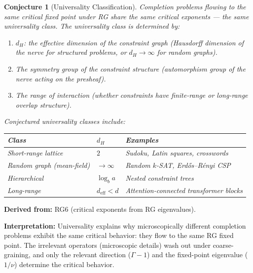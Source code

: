 \documentclass[11pt,letterpaper]{article}
\newtheorem{conjecture}{Conjecture}[section]
\begin{document}
\begin{conjecture}[Universality 
Classification]\label{conj:universality}
Completion problems flowing to the same critical fixed point under 
RG share the same critical exponents --- the same 
\emph{universality class}. The universality class is determined by:
\begin{enumerate}[label=(\roman*)]
    \item $d_H$: the effective dimension of the constraint graph 
    (Hausdorff dimension of the nerve for structured problems, or 
    $d_H \to \infty$ for random graphs).
    
    \item The \emph{symmetry group} of the constraint structure 
    (automorphism group of the nerve acting on the presheaf).
    
    \item The \emph{range of interaction} (whether constraints have 
    finite-range or long-range overlap structure).
\end{enumerate}

Conjectured universality classes include:

\begin{center}
\renewcommand{\arraystretch}{1.3}
\begin{tabular}{llp{3.8cm}}
\textbf{Class} & $d_H$ & \textbf{Examples} \\
\hline
Short-range lattice & $2$ & Sudoku, Latin squares, crosswords \\
Random graph (mean-field) & $\to \infty$ & Random $k$-SAT, 
Erd\H{o}s--R\'enyi CSP \\
Hierarchical & $\log_b a$ & Nested constraint trees \\
Long-range & $d_{\mathrm{eff}} < d$ & Attention-connected 
transformer blocks \\
\end{tabular}
\end{center}
\end{conjecture}

\textbf{Derived from:} RG6 (critical exponents from RG eigenvalues).

\textbf{Interpretation:} Universality explains why microscopically 
different completion problems exhibit the same critical behavior: 
they flow to the same RG fixed point. The irrelevant operators 
(microscopic details) wash out under coarse-graining, and only the 
relevant direction ($\Gamma - 1$) and the fixed-point eigenvalue 
($1/\nu$) determine the critical behavior.
\end{document}
